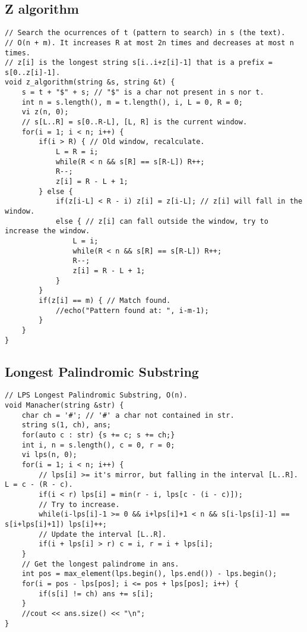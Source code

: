 \documentclass[a4paper]{article}
\begin{document}
\subsection*{Z algorithm}
\begin{verbatim}
// Search the ocurrences of t (pattern to search) in s (the text).
// O(n + m). It increases R at most 2n times and decreases at most n times. 
// z[i] is the longest string s[i..i+z[i]-1] that is a prefix = s[0..z[i]-1].
void z_algorithm(string &s, string &t) {
    s = t + "$" + s; // "$" is a char not present in s nor t.
    int n = s.length(), m = t.length(), i, L = 0, R = 0;
    vi z(n, 0);
    // s[L..R] = s[0..R-L], [L, R] is the current window.
    for(i = 1; i < n; i++) {
        if(i > R) { // Old window, recalculate.
            L = R = i;
            while(R < n && s[R] == s[R-L]) R++;
            R--;
            z[i] = R - L + 1;
        } else {
            if(z[i-L] < R - i) z[i] = z[i-L]; // z[i] will fall in the window.
            else { // z[i] can fall outside the window, try to increase the window.
                L = i;
                while(R < n && s[R] == s[R-L]) R++;
                R--;
                z[i] = R - L + 1;
            }
        }
        if(z[i] == m) { // Match found.
            //echo("Pattern found at: ", i-m-1);
        }
    }
}
\end{verbatim}
\subsection*{Longest Palindromic Substring}
\begin{verbatim}
// LPS Longest Palindromic Substring, O(n).
void Manacher(string &str) {
    char ch = '#'; // '#' a char not contained in str.
    string s(1, ch), ans;
    for(auto c : str) {s += c; s += ch;}
    int i, n = s.length(), c = 0, r = 0;
    vi lps(n, 0);
    for(i = 1; i < n; i++) {
        // lps[i] >= it's mirror, but falling in the interval [L..R]. L = c - (R - c).
        if(i < r) lps[i] = min(r - i, lps[c - (i - c)]);
        // Try to increase.
        while(i-lps[i]-1 >= 0 && i+lps[i]+1 < n && s[i-lps[i]-1] == s[i+lps[i]+1]) lps[i]++;
        // Update the interval [L..R].
        if(i + lps[i] > r) c = i, r = i + lps[i];
    }
    // Get the longest palindrome in ans.
    int pos = max_element(lps.begin(), lps.end()) - lps.begin();
    for(i = pos - lps[pos]; i <= pos + lps[pos]; i++) {
        if(s[i] != ch) ans += s[i];
    }
    //cout << ans.size() << "\n";
}
\end{verbatim}
\end{document}
